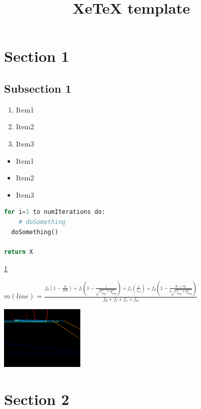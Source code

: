 \documentclass[a4paper,english,titlepage]{scrartcl}
\def\myauthor{}
\def\mytitle{XeTeX template}
\begin{document}
\title{\mytitle}
\author{\myauthor}

\maketitle
\tableofcontents{}

\newpage{}

\section{Section 1}
\label{sec:Section1}

\subsection{Subsection 1}
\label{sec:Section1_1}

\cite{Stronger2006}

\begin{enumerate}
\item Item1
\item Item2
\item Item3
\end{enumerate}

\begin{itemize}
\item Item1
\item Item2
\item Item3
\end{itemize}

\begin{lstlisting}[language=Python, caption=Python source, label=PythonCode]
for i=1 to numIterations do:
	# doSomething
  doSomething()

return X
\end{lstlisting}



\ref{sec:Section1}

\begin{center}
$m(line)=\frac{f_{\theta}\left(1-\frac{\theta}{180}\right)+f_{l}\left(1-\frac{l}{\sqrt{x_{img}^{2}+y_{img}^{2}}}\right)+f_{o}\left(\frac{o}{l_{ex}}\right)+f_{d}\left(1-\frac{d_{1}+d_{2}}{2\sqrt{x_{img}^{2}+y_{img}^{2}}}\right)}{f_{\theta}+f_{l}+f_{o}+f_{d}}$
\par\end{center}

\begin{center}
\includegraphics[width=0.3\textwidth]{img/test}
\par\end{center}

\clearpage{}

\section{Section 2}
\label{sec:Section2}

\clearpage{}



\end{document}
